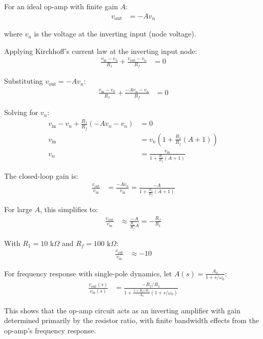 \documentclass[11pt,a4paper]{article}
\begin{document}
For an ideal op-amp with finite gain $A$:
\begin{align}
  v_{\text{out}} &= -A v_n
\end{align}

where $v_n$ is the voltage at the inverting input (node voltage).

Applying Kirchhoff's current law at the inverting input node:
\begin{align}
  \frac{v_{\text{in}} - v_n}{R_1} + \frac{v_{\text{out}} - v_n}{R_f} &= 0
\end{align}

Substituting $v_{\text{out}} = -Av_n$:
\begin{align}
  \frac{v_{\text{in}} - v_n}{R_1} + \frac{-Av_n - v_n}{R_f} &= 0
\end{align}

Solving for $v_n$:
\begin{align}
  v_{\text{in}} - v_n + \frac{R_1}{R_f}(-Av_n - v_n) &= 0 \\
  v_{\text{in}} &= v_n\left(1 + \frac{R_1}{R_f}(A + 1)\right) \\
  v_n &= \frac{v_{\text{in}}}{1 + \frac{R_1}{R_f}(A + 1)}
\end{align}

The closed-loop gain is:
\begin{align}
  \frac{v_{\text{out}}}{v_{\text{in}}} &= \frac{-Av_n}{v_{\text{in}}} = \frac{-A}{1 + \frac{R_1}{R_f}(A + 1)}
\end{align}

For large $A$, this simplifies to:
\begin{align}
  \frac{v_{\text{out}}}{v_{\text{in}}} &\approx \frac{-A}{\frac{R_1}{R_f}A} = -\frac{R_f}{R_1}
\end{align}

With $R_1 = 10$ k$\Omega$ and $R_f = 100$ k$\Omega$:
\begin{align}
  \frac{v_{\text{out}}}{v_{\text{in}}} &\approx -10
\end{align}

For frequency response with single-pole dynamics, let $A(s) = \frac{A_0}{1 + s/\omega_0}$:
\begin{align}
  \frac{v_{\text{out}}(s)}{v_{\text{in}}(s)} &= \frac{-R_f/R_1}{1 + \frac{1 + R_f/R_1}{A_0}(1 + s/\omega_0)}
\end{align}

This shows that the op-amp circuit acts as an inverting amplifier with gain determined primarily by the resistor ratio, with finite bandwidth effects from the op-amp's frequency response.
\end{document}
